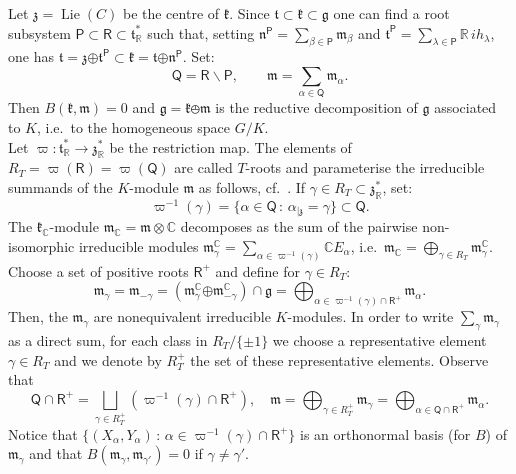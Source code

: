 \documentclass[a4paper,reqno]{amsart}
\theoremstyle{definition}
\theoremstyle{remark}
\theoremstyle{plain}
\numberwithin{equation}{section}
\newcommand{\C}{{\mathbb{C}}}
\newcommand{\R}{{\mathbb{R}}}
\newcommand{\g}{{\mathfrak{g}}}  %
\newcommand{\fm}{{\mathfrak{m}}}
\newcommand{\fn}{{\mathfrak{n}}}
\newcommand{\fk}{{\mathfrak{k}}}  \renewcommand{\k}{{\mathfrak{k}}}
\newcommand{\fz}{{\mathfrak{z}}}
\newcommand{\ft}{{\mathfrak{t}}}
\def\Lie{\operatorname {Lie}}
\def\boplus{\mathbin{\boldsymbol{\oplus}}}
\newcommand{\vpi}{\varpi}
\newcommand{\sminus}{{\smallsetminus}}
\newcommand{\roots}{\mathsf{R}}
\newcommand{\proots}{\mathsf{R}^+}
\newcommand{\rootsP}{\mathsf{P}}
\newcommand{\rootsQ}{\mathsf{Q}}
\begin{document}
Let $\fz =\Lie(C)$ be the centre of $\fk$. Since
$\ft \subset \fk \subset \g$ one can find a root subsystem
$\rootsP \subset \roots \subset \ft_\R^*$ such that,
setting $\fn^\rootsP =  {\sum_{\beta \in \rootsP}}
  \fm_\beta$ and $\ft^\rootsP =\sum_{\lambda \in \rootsP} \R
  \, ih_\lambda$, one has $\ft = \fz \boplus \ft^{\rootsP} \subset
  \fk = \ft \boplus
  \fn^\rootsP$.
Set:
\begin{equation*} \label{eq6.2}
  \rootsQ= \roots \sminus \rootsP, \qquad \fm = \sum_{\alpha \in
    \rootsQ} \fm_\alpha.
\end{equation*}
Then
$B(\fk,\fm) = 0$ and $\g= \fk \obot \fm$ is the
reductive decomposition of $\g$ associated to $K$, i.e.~to the
homogeneous space $G/K$.
\\
 Let $\varpi : \mathfrak{t}_\R^* \to \mathfrak{z}_\R^*$ be
the restriction map. The elements of  $R_T =
\varpi(\roots) = \varpi(\rootsQ)$ are called $T$-roots and 
parameterise the irreducible summands of
the $K$-module $\fm$ as follows, cf.~\cite[Theorem~7.3]{Arv}. If
$\gamma \in R_T \subset \fz_\R^*$, set:
\begin{equation} \label{eq6.4b}
  \varpi^{-1}(\gamma) = \{\alpha \in \rootsQ \, : \, \alpha_{\mid
  \fz} = \gamma\} \subset \rootsQ.
\end{equation}
The $\fk_\C$-module $\fm_\C = \fm \otimes \C$ decomposes as the
sum of the pairwise non-isomorphic irreducible modules
$\fm_\gamma^\C = \sum_{\alpha \in \vpi^{-1}(\gamma)} \C
E_\alpha$,
i.e.~$\fm_\C = \bigoplus_{\gamma \in R_T} \fm_\gamma^\C$.
Choose a set of positive roots
$\proots$ and define for $\gamma \in R_T$:
\begin{equation*}
  \label{eq6.4a}
  \fm_\gamma = \fm_{-\gamma} = (\fm_\gamma^\C \boplus \fm_{-\gamma}^\C)
  \cap \g = \bigoplus_{\alpha \in \varpi^{-1}(\gamma) \cap
    \proots} \fm_\alpha.
\end{equation*}
Then, the  $\fm_\gamma$  are
nonequivalent irreducible $K$-modules. In order to write $\sum_\gamma\fm_\gamma$ as a direct sum,  for each
class in $R_T/\{\pm 1\}$ we choose a representative element
$\gamma \in R_T$ and we denote by $R_T^+$ the set of these
representative elements. Observe that
\[
\rootsQ \cap \proots= \bigsqcup_{\gamma \in R_T^+}
(\vpi^{-1}(\gamma) \cap \proots), \quad \fm=  \bigoplus_{\gamma \in R_T^+} \fm_\gamma = \bigoplus_{\alpha
  \in \rootsQ \cap \proots} \fm_\alpha.
\]
Notice that  $\{(X_\alpha,Y_\alpha) \, : \, {\alpha \in
  \varpi^{-1}(\gamma) \cap \proots}\}$ is an orthonormal basis (for $B$) of
$\fm_\gamma$ and  that $B(\fm_\gamma,\fm_{\gamma'})= 0$ if $\gamma \ne
\gamma'$. 
\end{document}
